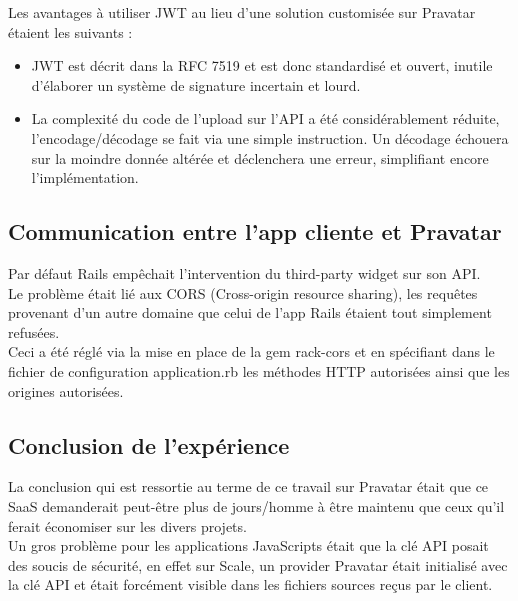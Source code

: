 \documentclass{report}
\begin{document}
          Les avantages à utiliser JWT au lieu d'une solution customisée sur Pravatar étaient les suivants :\\

          \begin{itemize}
            \item JWT est décrit dans la RFC 7519 et est donc standardisé et ouvert, inutile d'élaborer
          un système de signature incertain et lourd.
            \item La complexité du code de l'upload sur l'API a été considérablement réduite, l'encodage/décodage se fait via une simple instruction.
          Un décodage échouera sur la moindre donnée altérée et déclenchera une erreur, simplifiant encore l'implémentation.\\
          \end{itemize}

      \subsection{Communication entre l'app cliente et Pravatar}
      \label{sub:Communication entre l'app cliente et Pravatar}

        Par défaut Rails empêchait l'intervention du third-party widget sur son API.\\

        Le problème était lié aux CORS (Cross-origin resource sharing), les requêtes provenant d'un autre domaine
        que celui de l'app Rails étaient tout simplement refusées.\\

        Ceci a été réglé via la mise en place de la gem rack-cors et en spécifiant dans le fichier de configuration
        application.rb les méthodes HTTP autorisées ainsi que les origines autorisées.\\

      \subsection{Conclusion de l'expérience}
      \label{sub:Conclusion}

        La conclusion qui est ressortie au terme de ce travail sur Pravatar était que ce SaaS demanderait peut-être plus de jours/homme à être maintenu que ceux qu'il
        ferait économiser sur les divers projets.\\

        Un gros problème pour les applications JavaScripts était que la clé API posait des soucis de sécurité, en effet sur Scale, un provider Pravatar était initialisé avec la clé
        API et était forcément visible dans les fichiers sources reçus par le client.\\
\end{document}
